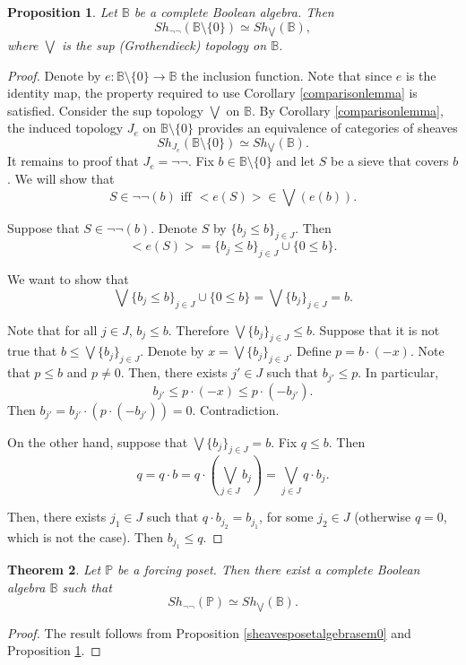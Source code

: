\documentclass[10pt,a4paper]{amsart}
\newtheorem{Theo}{Theorem}[section]
\newtheorem{Prop}[Theo]{Proposition}
\newcommand{\Po}{\mathbb{P}}
\newcommand{\B}{\mathbb{B}}
\begin{document}
\begin{Prop}\label{sheavesnegationandsup}
	Let $\B$ be a complete Boolean algebra. Then
	$$Sh_{\neg \neg}(\B \setminus{\{0\}}) \simeq Sh_{\bigvee}(\B),$$
	where $\bigvee$ is the sup (Grothendieck) topology on $\B$.
\end{Prop}
\begin{proof}
	Denote by $e: \B \setminus \{ 0 \} \to \B$ the inclusion function. Note that since $e$ is the identity map, the property required to use Corollary \ref{comparisonlemma} is satisfied. Consider the sup topology $\bigvee$ on $\B$. By Corollary \ref{comparisonlemma}, the induced topology $J_{e}$ on $\B \setminus \{ 0\}$ provides an equivalence of categories of sheaves 
	$$Sh_{J_{e}}(\B \setminus \{0\}) \simeq Sh_{\bigvee}(\B).$$
	It remains to proof that $J_{e} = \neg \neg$. Fix $b \in \B \setminus \{ 0\}$ and let $S$ be a sieve that covers $b$. We will show that
	$$S \in \neg \neg(b) \text{ iff } <e(S)> \in \bigvee (e(b)).$$
	
	Suppose that $S \in \neg \neg (b)$. Denote $S$ by $ \{b_{j} \leq b\}_{j \in J}$. Then 
	$$<e(S)> = \{b_{j} \leq b\}_{j \in J} \cup \{0 \leq b\}. $$
	
	We want to show that 
	$$\bigvee \{b_{j} \leq b\}_{j \in J}\cup \{ 0 \leq b\} = \bigvee \{b_{j}\}_{j \in J} = b.$$
	
	Note that for all $j \in J$, $b_{j} \leq b$.  Therefore $\bigvee \{b_{j}\}_{j \in J} \leq b$. Suppose that it is not true that $b \leq \bigvee \{b_{j}\}_{j \in J}$. Denote by $x = \bigvee \{b_{j}\}_{j \in J}.$ Define $p = b \cdot (-x).$ Note that $p \leq b$ and $p \neq 0$. Then, there exists $j' \in J$ such that $b_{j'} \leq p$. In particular,
	$$b_{j'} \leq p \cdot (-x) \leq p \cdot (-b_{j'}).$$
	Then $b_{j'} = b_{j'}\cdot(p\cdot(-b_{j'})) = 0$. Contradiction. 
	
	On the other hand, suppose that $\bigvee\{b_{j}\}_{j \in J} = b.$ Fix $q \leq b$. Then
	$$q = q \cdot b = q \cdot(\underset{j \in J}{\bigvee}b_{j}) = \underset{j \in J}{\bigvee} q \cdot b_{j}.$$
	
	Then, there exists $j_{1} \in J$ such that $q \cdot b_{j_{2}} = b_{j_{1}}$, for some $j_{2} \in J$ (otherwise $q = 0$, which is not the case). Then $b_{j_{1}} \leq q$.
\end{proof}

\begin{Theo}\label{HugoMicheltheorem2}
	Let $\Po$ be a forcing poset. Then there exist a complete Boolean algebra $\B$ such that
	$$Sh_{\neg \neg}(\Po) \simeq Sh_{\bigvee}( \mathbb B).$$
\end{Theo}
\begin{proof}
	The result follows from Proposition \ref{sheavesposetalgebrasem0} and Proposition \ref{sheavesnegationandsup}.
\end{proof}
\end{document}
